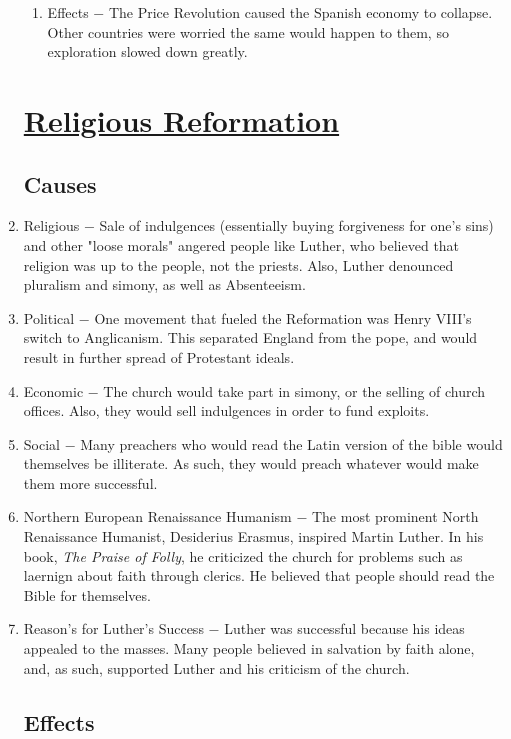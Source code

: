 \documentclass[12pt]{article}
\begin{document}
\begin{enumerate}
\begin{enumerate}[label=\arabic{*}.]
\item Effects $-$ The Price Revolution caused the Spanish economy to collapse. Other countries were worried the same would happen to them, so exploration slowed down greatly.
\end{enumerate}
\setcounter{enumi}{71}
\section{\underline{Religious Reformation}}

\subsection{Causes}

\item Religious $-$ Sale of indulgences (essentially buying forgiveness for one's sins) and other "loose morals" angered people like Luther, who believed that religion was up to the people, not the priests. Also, Luther denounced pluralism and simony, as well as Absenteeism.

\item Political $-$ One movement that fueled the Reformation was Henry VIII's switch to Anglicanism. This separated England from the pope, and would result in further spread of Protestant ideals.

\item Economic $-$ The church would take part in simony, or the selling of church offices. Also, they would sell indulgences in order to fund exploits.

\item Social $-$ Many preachers who would read the Latin version of the bible would themselves be illiterate. As such, they would preach whatever would make them more successful.

\item Northern European Renaissance Humanism $-$ The most prominent North Renaissance Humanist, Desiderius Erasmus, inspired Martin Luther. In his book, \textit{The Praise of Folly}, he criticized the church for problems such as laernign about faith through clerics. He believed that people should read the Bible for themselves.

\item Reason's for Luther's Success $-$ Luther was successful because his ideas appealed to the masses. Many people believed in salvation by faith alone, and, as such, supported Luther and his criticism of the church.

\subsection{Effects}


\end{enumerate}
\end{document}
